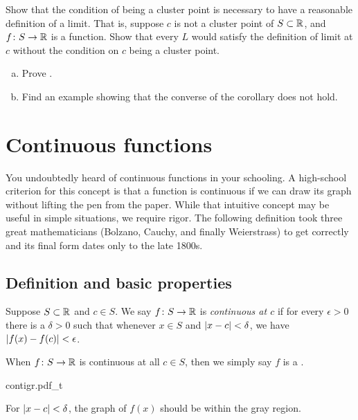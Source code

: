 \begin{exercise}
Show that the condition of being a cluster point is necessary to have a
reasonable definition of a limit.  That is, suppose $c$ is not a cluster
point of $S \subset {\mathbb{R}}$, and $f \colon S \to {\mathbb{R}}$ is a function.  Show that
every $L$ would satisfy the definition of limit at $c$ without the condition
on $c$ being a cluster point.
\end{exercise}

\begin{exercise}
\leavevmode
\begin{enumerate}[a)]
\item
Prove .
\item
Find an example showing that the converse of
the corollary does not hold.
\end{enumerate}
\end{exercise}


\sectionnewpage
\section{Continuous functions}
\label{sec:cont}


You undoubtedly heard of continuous functions in your schooling.  A
high-school criterion for this concept is that a function is continuous if
we can draw its graph without lifting the pen from the paper.  While that
intuitive concept may be useful in simple situations, we require
rigor.  The following definition took three great mathematicians
(Bolzano, Cauchy, and finally Weierstrass) to get correctly and its final
form dates only to the late 1800s.

\subsection{Definition and basic properties}

\begin{defn}
Suppose $S \subset {\mathbb{R}}$ and $c \in S$.
We say $f \colon S \to {\mathbb{R}}$
is \emph{continuous at $c$}
if for every $\epsilon > 0$
there is a $\delta > 0$ such that whenever $x \in S$ and $\left\lvert {x-c} \right\rvert <
\delta$, we have
$\left\lvert {f(x)-f(c)} \right\rvert < \epsilon$.


When $f \colon S \to {\mathbb{R}}$ is continuous at all $c \in S$, then we simply say
$f$ is a \emph{}.
\end{defn}
\begin{myfigureht}
{contigr.pdf_t}
\caption{For $\left\lvert {x-c} \right\rvert < \delta$, the graph of $f(x)$ should be within the gray region.\label{fig:contigr}}
\end{myfigureht}

